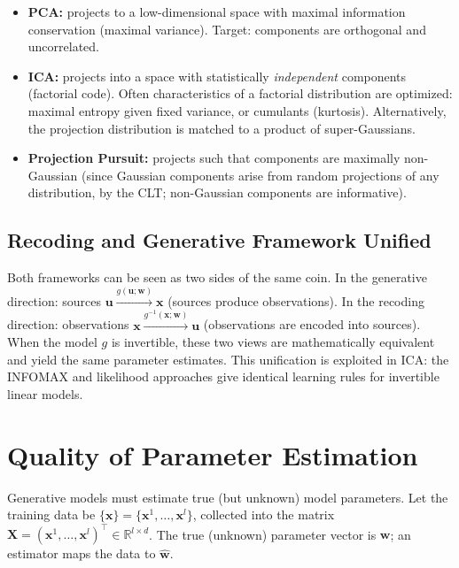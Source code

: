 \documentclass[11pt, oneside]{book}
\newcommand{\R}{\mathbb{R}}
\newcommand{\T}{^{\top}}
\newcommand{\wvec}{\bm{w}}
\newcommand{\what}{\hat{\bm{w}}}
\newcommand{\xvec}{\bm{x}}
\newcommand{\Xmat}{\bm{X}}
\newcommand{\uvec}{\bm{u}}
\begin{document}
\begin{itemize}
  \item \textbf{PCA:} projects to a low-dimensional space with maximal information
        conservation (maximal variance). Target: components are orthogonal and uncorrelated.

  \item \textbf{ICA:} projects into a space with statistically \emph{independent}
        components (factorial code). Often characteristics of a factorial distribution are
        optimized: maximal entropy given fixed variance, or cumulants (kurtosis).
        Alternatively, the projection distribution is matched to a product of
        super-Gaussians.

  \item \textbf{Projection Pursuit:} projects such that components are maximally
        non-Gaussian (since Gaussian components arise from random projections of any
        distribution, by the CLT; non-Gaussian components are informative).
\end{itemize}

\subsection{Recoding and Generative Framework Unified}

Both frameworks can be seen as two sides of the same coin.
In the generative direction: sources $\uvec \xrightarrow{g(\uvec;\wvec)} \xvec$
(sources produce observations).
In the recoding direction: observations $\xvec \xrightarrow{g^{-1}(\xvec;\wvec)} \uvec$
(observations are encoded into sources).
When the model $g$ is invertible, these two views are mathematically equivalent and
yield the same parameter estimates.
This unification is exploited in ICA: the INFOMAX and likelihood approaches give
identical learning rules for invertible linear models.


\section{Quality of Parameter Estimation}
\label{sec:quality-estimation}

Generative models must estimate true (but unknown) model parameters.
Let the training data be $\{\xvec\} = \{\xvec^1,\ldots,\xvec^l\}$, collected into the
matrix $\Xmat = (\xvec^1,\ldots,\xvec^l)\T \in \R^{l \times d}$.
The true (unknown) parameter vector is $\wvec$; an estimator maps the data to $\what$.
\end{document}
